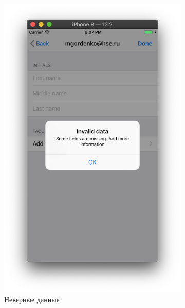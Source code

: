 \documentclass[a4paper,12pt]{article}
\begin{document}
\begin{figure}[h!]
\begin{subfigure}[b]{0.3\linewidth}
			\includegraphics[width=\linewidth]{../includes/ro/invaliddata.png}
			\caption{\label{pic: invaliddata} Неверные данные}
		\end{subfigure}
		\begin{subfigure}[b]{0.3\linewidth}

\end{subfigure}
\end{figure}
\end{document}
